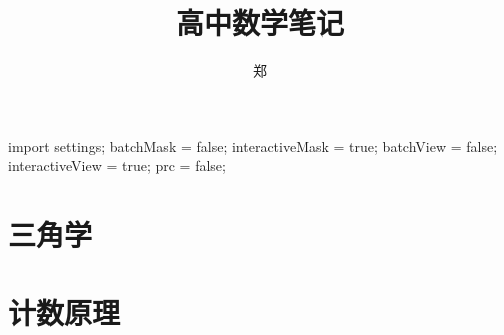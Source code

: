 \documentclass[a4paper, openany, UTF8]{ctexbook}
\title{{\Huge 高中数学笔记}}
\author{郑}
\begin{document}
	\begin{asydef}
		import settings;
		batchMask = false;
		interactiveMask = true;
		batchView = false;
		interactiveView = true;
		prc = false;
	\end{asydef}

	\frontmatter
	\setcounter{tocdepth}{1}
	\maketitle

	

	\tableofcontents
	\clearpage
	\mainmatter
	\raggedbottom

	\part{三角学}
	
	

	\part{计数原理}
	
	
\end{document}
